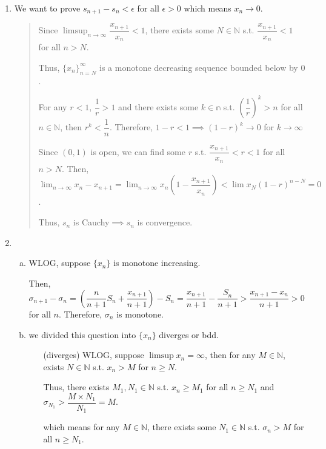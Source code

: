 \documentclass[12pt]{article}
\begin{document}
\begin{enumerate}
    \item We want to prove $s_{n+1} - s_n < \epsilon$ for all $\epsilon > 0$ which means $x_n \to 0$.
    \begin{quote}
        Since $\displaystyle\limsup_{n \to \infty} \dfrac{x_{n+1}}{x_n} < 1$, 
        there exists some $N\in \mathbb{N}$ s.t. $\dfrac{x_{n+1}}{x_n} < 1$ for all $n > N$.

        Thus, $\lbrace x_n\rbrace_{n = N}^\infty$ is a monotone decreasing sequence bounded below by $0$.

        For any $r < 1$, $\dfrac{1}{r} > 1$ and there exists some $k \in \mathbb{n}$ s.t. $(\dfrac{1}{r})^k > n$ for all $n\in \mathbb{N}$,
        then $r^k < \dfrac{1}{n}$. Therefore, $1-r < 1\implies (1-r)^k \to 0$ for $k \to \infty$
        
        Since $(0, 1)$ is open, we can find some $r$ s.t.  $\dfrac{x_{n+1}}{x_n} < r < 1$ for all $n > N$. 
        Then, $\displaystyle\lim_{n \to \infty} x_n - x_{n+1} = \displaystyle\lim_{n\to \infty} x_n(1-\dfrac{x_{n+1}}{x_n}) < \lim x_N (1 - r)^{n-N} = 0$.

        Thus, $s_n$ is Cauchy$\implies s_n$ is convergence.
    \end{quote}

    \newpage
    \item \begin{enumerate}[(a)]
        \item WLOG, suppose $\lbrace x_n \rbrace$ is monotone increasing.
        
        Then, $\sigma_{n+1} - \sigma_n = (\dfrac{n}{n+1} S_n + \dfrac{x_{n+1}}{n+1}) - S_n = \dfrac{x_{n+1}}{n+1} - \dfrac{S_n}{n+1} > \dfrac{x_{n+1}-x_n}{n+1} > 0$ for all $n$.
        Therefore, $\sigma_n$ is monotone.

        \item we divided this question into $\lbrace x_n\rbrace$ diverges or bdd.
        
        \begin{enumerate}
            \item[(diverges)] WLOG, suppose $\limsup x_n = \infty$, then for any $M\in \mathbb{N}$, exists $N \in \mathbb{N}$ s.t. $x_n > M$ for $n \geq N$.
            
            Thus, there exists $M_1, N_1 \in \mathbb{N}$ s.t. $x_n \geq M_1$ for all $n \geq N_1$ and $\sigma_{N_1} > \dfrac{M\times N_1}{N_1} = M$.

            which means for any $M \in \mathbb{N}$, there exists some $N_1 \in \mathbb{N}$ s.t. $\sigma_n > M$ for all $n \geq N_1$.


\end{enumerate}
\end{enumerate}
\end{enumerate}
\end{document}
